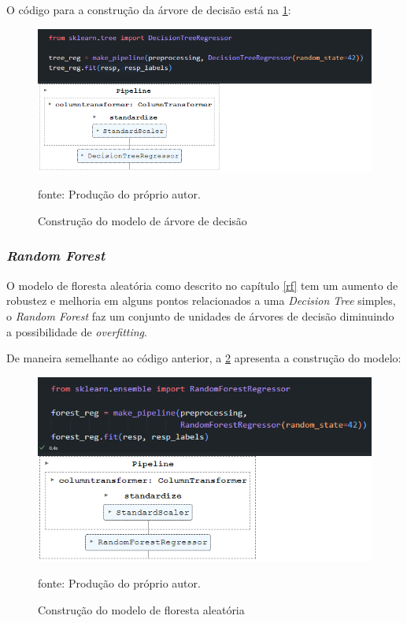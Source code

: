 \documentclass[
  12pt,		%
  a4paper,	%
  openright,%
  oneside,	%
  chapter=TITLE,		%
  section=TITLE,		%
  english,	%
  french,	%
  spanish,	%
  brazil	%
]{abntex2}
\begin{document}
    O código para a construção da árvore de decisão está na \ref*{tree_reg}:

    \begin{figure}[ht]
        \centering
        \caption{Construção do modelo de árvore de decisão}
        \includegraphics[width=12cm]{../reports/figures/decision_tree_model.png}
        \label{tree_reg}
        \par
        {\small fonte: Produção do próprio autor.}
    \end{figure}

    \subsubsection{\textit{Random Forest}}

    O modelo de floresta aleatória como descrito no capítulo \ref*{rf} tem um aumento de robustez e melhoria em alguns pontos
    relacionados a uma \textit{Decision Tree} simples, o \textit{Random Forest} faz um conjunto de unidades de árvores de decisão
    diminuindo a possibilidade de \textit{overfitting}.

    De maneira semelhante ao código anterior, a \ref*{rf_reg} apresenta a construção do modelo:

    \begin{figure}[ht]
        \centering
        \caption{Construção do modelo de floresta aleatória}
        \includegraphics[width=12cm]{../reports/figures/rf_model.png}
        \label{rf_reg}
        \par
        {\small fonte: Produção do próprio autor.}
    \end{figure}
\end{document}
